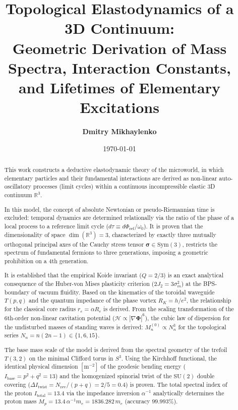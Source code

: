 \documentclass[12pt,a4paper]{article}
\title{\textbf{Topological Elastodynamics of a 3D Continuum:\\ Geometric Derivation of Mass Spectra, Interaction Constants, and Lifetimes of Elementary Excitations}}
\author{\textbf{Dmitry Mikhaylenko}}
\date{\today}
\begin{document}
	
	\maketitle
	
	\begin{abstract}
		This work constructs a deductive elastodynamic theory of the microworld, in which elementary particles and their fundamental interactions are derived as non-linear auto-oscillatory processes (limit cycles) within a continuous incompressible elastic 3D continuum $\mathbb{R}^3$. 
		
		In this model, the concept of absolute Newtonian or pseudo-Riemannian time is excluded: temporal dynamics are determined relationally via the ratio of the phase of a local process to a reference limit cycle ($d\tau \equiv d\Phi_{\text{ref}}/\omega_0$). It is proven that the dimensionality of space $\dim(\mathbb{R}^3) = 3$, characterized by exactly three mutually orthogonal principal axes of the Cauchy stress tensor $\boldsymbol{\sigma} \in \mathrm{Sym}(3)$, restricts the spectrum of fundamental fermions to three generations, imposing a geometric prohibition on a 4th generation.
		
		It is established that the empirical Koide invariant ($Q = 2/3$) is an exact analytical consequence of the Huber-von Mises plasticity criterion ($2J_2 = 3\sigma_m^2$) at the BPS-boundary of vacuum fluidity. Based on the kinematics of the toroidal waveguide $T(p,q)$ and the quantum impedance of the phase vortex $R_K = h/e^2$, the relationship for the classical core radius $r_e = \alpha R_e$ is derived. From the scaling transformation of the 6th-order non-linear cavitation potential ($\mathcal{H} \propto |\nabla\boldsymbol{\Phi}|^6$), the cubic law of dispersion for the undisturbed masses of standing waves is derived: $M_n^{(0)} \propto N_n^3$ for the topological series $N_n = n(2n-1) \in \{1, 6, 15\}$.
		
		The base mass scale of the model is derived from the spectral geometry of the trefoil $T(3,2)$ on the minimal Clifford torus in $S^3$. Using the Kirchhoff functional, the identical physical dimension $[\text{m}^{-2}]$ of the geodesic bending energy ($I_{\text{base}} = p^2 + q^2 = 13$) and the homogenized spinorial twist of the $\mathrm{SU}(2)$ double covering ($\Delta I_{\text{twist}} = N_{\text{rev}}/(p+q) = 2/5 = 0.4$) is proven. The total spectral index of the proton $I_{\text{total}} = 13.4$ via the impedance inversion $\alpha^{-1}$ analytically determines the proton mass $M_p = 13.4 \, \alpha^{-1} m_e = 1836.282 \, m_e$ (accuracy $99.993\%$).
		

\end{abstract}
\end{document}
